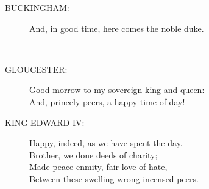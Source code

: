 \documentclass{article}
\begin{document}
\begin{description}
\item[BUCKINGHAM:] 
\hspace{1pt}And, in good time, here comes the noble duke.\\
\end{description}
\\
\begin{description}
\item[GLOUCESTER:] 
\hspace{1pt}Good morrow to my sovereign king and queen:\\
\hspace{1pt}And, princely peers, a happy time of day!\\
\end{description}
\begin{description}
\item[KING EDWARD IV:] 
\hspace{1pt}Happy, indeed, as we have spent the day.\\
\hspace{1pt}Brother, we done deeds of charity;\\
\hspace{1pt}Made peace enmity, fair love of hate,\\
\hspace{1pt}Between these swelling wrong-incensed peers.\\
\end{description}
\end{document}
